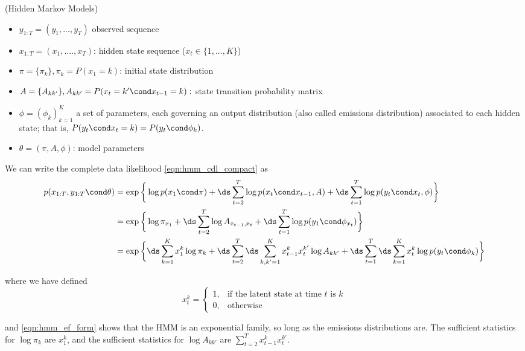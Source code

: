\documentclass{article} %
\newcommand{\state}{x}
\begin{document}
\begin{example}{(Hidden Markov Models)}
\begin{itemize}
\item $y_{1:T}=(y_1, ..., y_T)$ observed sequence
\item $\state_{1:T} =(\state_1, ...., \state_T)$: hidden state sequence ($\state_t \in \{1,...,K \}$) 
\item $\pi = \{ \pi_k \}, \pi_k = P(\state_1 = k)$: initial state distribution
\item $A=\{A_{kk'}\}, A_{kk'} = P(\state_t= k' \cond \state_{t-1}=k):$ state transition probability matrix 
\item $\phi = (\phi_k)_{k=1}^K$ a set of parameters, each governing an output distribution (also called emissions distribution) associated to each hidden state; that is, $ P(y_t \cond \state_t=k) = P(y_t \cond \phi_k)$. 
\item $\theta = (\pi, A, \phi)$: model parameters
\end{itemize}


We can write the complete data likelihood \eqref{eqn:hmm_cdl_compact} as
\begin{align}
p(\state_{1:T}, y_{1:T} \cond \theta) &=  \exp\bigg \{ \log p(\state_1 \cond \pi) + \ds\sum_{t=2}^T \log p(\state_t \cond \state_{t-1}, A) +  \ds\sum_{t=1}^T \log p(y_t \cond \state_t, \phi) \bigg\}  \nonumber \\
&= \exp \bigg \{ \log \pi_{\state_1}  + \ds\sum_{t=2}^T \log A_{\state_{t-1}, \state_t} + \ds\sum_{t=1}^T \log p(y_1 \cond \phi_{\state_t}) \bigg\} \nonumber \\
&=  \exp\bigg \{  \ds\sum_{k=1}^K \state_1^k \log \pi_k + \ds\sum_{t=2}^T \ds\sum_{k, k'=1}^K \state_{t-1}^k \state_t^{k'} \log A_{kk'} + \ds\sum_{t=1}^T \ds\sum_{k=1}^K \state_t^k \log p(y_t \cond \phi_k)  \bigg\} \label{eqn:hmm_ef_form}
\end{align}

where we have defined
\[ \state_t^k =  
\begin{cases}	  
1, & \text{if the latent state at time $t$ is $k$} \\
0, & \text{otherwise}
\end{cases} \]

and \eqref{eqn:hmm_ef_form} shows that the HMM is an exponential family, so long as the emissions distributions are. 
The sufficient statistics for $\log \pi_k$ are $\state_1^k$, and the sufficient statistics for $\log A_{kk'}$ are $\sum_{t=2}^T \state_{t-1}^k \state_t^{k'}$. 

\end{example}
\end{document}
